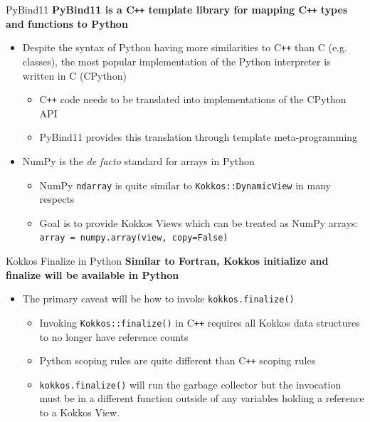 \begin{frame}[fragile]{PyBind11}
\textbf{PyBind11 is a C\texttt{++} template library for mapping C\texttt{++} types and functions to Python}

\begin{itemize}
  \item Despite the syntax of Python having more similarities to C\texttt{++} than C (e.g. classes),
  the most popular implementation of the Python interpreter is written in C (CPython)
  \begin{itemize}
    \item C\texttt{++} code needs to be translated into implementations of the CPython API
    \item PyBind11 provides this translation through template meta-programming
  \end{itemize}
  \item NumPy is the \textit{de facto} standard for arrays in Python
  \begin{itemize}
     \item NumPy \lstinline|ndarray| is quite similar to \lstinline|Kokkos::DynamicView| in many respects
     \item Goal is to provide Kokkos Views which can be treated as NumPy arrays: \lstinline|array = numpy.array(view, copy=False)|
  \end{itemize}
\end{itemize}

\end{frame}

\begin{frame}[fragile]{Kokkos Finalize in Python}
\textbf{Similar to Fortran, Kokkos initialize and finalize will be available in Python}

\begin{itemize}
  \item The primary caveat will be how to invoke \lstinline|kokkos.finalize()|
  \begin{itemize}
  \item Invoking \lstinline|Kokkos::finalize()| in C\texttt{++} requires all Kokkos data structures to no longer have reference counts
  \item Python scoping rules are quite different than C\texttt{++} scoping rules
  \item \lstinline|kokkos.finalize()| will run the garbage collector but the invocation must be in a different function
  outside of any variables holding a reference to a Kokkos View.
  \end{itemize}
\end{itemize}

\end{frame}

